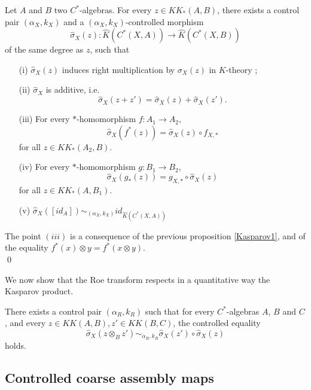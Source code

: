 \begin{prop}
Let $A$ and $B$ two $C^*$-algebras. For every $z\in KK_*(A,B)$, there exists a control pair $(\alpha_X,k_X)$ and a $(\alpha_X,k_X)$-controlled morphism
\[\hat\sigma_X(z) : \hat K(C^*(X,A))\rightarrow \hat K(C^*(X,B))\]
of the same degree as $z$, such that
\begin{enumerate}
\item[(i)] $\hat\sigma_X(z)$ induces right multiplication by $\sigma_X(z)$ in $K$-theory ;
\item[(ii)] $\hat\sigma_X$ is additive, i.e.
\[\hat\sigma_X(z+z')=\hat\sigma_X(z)+\hat\sigma_X(z').\]
\item[(iii)] For every $*$-homomorphism $f : A_1\rightarrow A_2$,
\[\hat\sigma_X(f^*(z))=\hat\sigma_X(z)\circ f_{X,*}\] for all $z\in KK_*(A_2,B)$.
\item[(iv)] For every $*$-homomorphism $g : B_1\rightarrow B_2$,
\[\hat\sigma_X(g_*(z))= g_{X,*}\circ \hat\sigma_X(z)\] for all $z\in KK_*(A,B_1)$.
\item[(v)] $\hat\sigma_X([id_A]) \sim_{(\alpha_X,k_X)} id_{\hat K(C^*(X,A))}$
\end{enumerate}
\end{prop}

\begin{dem}
The point $(iii)$ is a consequence of the previous proposition \ref{Kasparov1}, and of the equality $f^*(x)\otimes y = f^*(x\otimes y)$.\\
\qed
\end{dem}

We now show that the Roe transform respects in a quantitative way the Kasparov product.

\begin{prop} There exists a control pair $(\alpha_R,k_R)$ such that for every $C^*$-algebras $A$, $B$ and $C$, and every $z\in KK(A,B),z'\in KK(B,C)$, the controlled equality
\[\hat\sigma_X(z\otimes_B z') \sim_{\alpha_R,k_R} \hat\sigma_X(z')\circ \hat\sigma_X(z)\]
holds.
\end{prop}

\subsection{Controlled coarse assembly maps}

